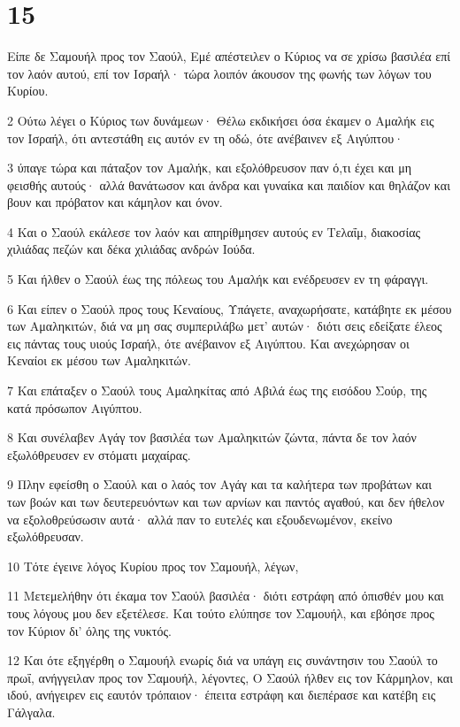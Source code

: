 \chapter{15}

\par Είπε δε Σαμουήλ προς τον Σαούλ, Εμέ απέστειλεν ο Κύριος να σε χρίσω βασιλέα επί τον λαόν αυτού, επί τον Ισραήλ· τώρα λοιπόν άκουσον της φωνής των λόγων του Κυρίου.
\par 2 Ούτω λέγει ο Κύριος των δυνάμεων· Θέλω εκδικήσει όσα έκαμεν ο Αμαλήκ εις τον Ισραήλ, ότι αντεστάθη εις αυτόν εν τη οδώ, ότε ανέβαινεν εξ Αιγύπτου·
\par 3 ύπαγε τώρα και πάταξον τον Αμαλήκ, και εξολόθρευσον παν ό,τι έχει και μη φεισθής αυτούς· αλλά θανάτωσον και άνδρα και γυναίκα και παιδίον και θηλάζον και βουν και πρόβατον και κάμηλον και όνον.
\par 4 Και ο Σαούλ εκάλεσε τον λαόν και απηρίθμησεν αυτούς εν Τελαΐμ, διακοσίας χιλιάδας πεζών και δέκα χιλιάδας ανδρών Ιούδα.
\par 5 Και ήλθεν ο Σαούλ έως της πόλεως του Αμαλήκ και ενέδρευσεν εν τη φάραγγι.
\par 6 Και είπεν ο Σαούλ προς τους Κεναίους, Υπάγετε, αναχωρήσατε, κατάβητε εκ μέσου των Αμαληκιτών, διά να μη σας συμπεριλάβω μετ' αυτών· διότι σεις εδείξατε έλεος εις πάντας τους υιούς Ισραήλ, ότε ανέβαινον εξ Αιγύπτου. Και ανεχώρησαν οι Κεναίοι εκ μέσου των Αμαληκιτών.
\par 7 Και επάταξεν ο Σαούλ τους Αμαληκίτας από Αβιλά έως της εισόδου Σούρ, της κατά πρόσωπον Αιγύπτου.
\par 8 Και συνέλαβεν Αγάγ τον βασιλέα των Αμαληκιτών ζώντα, πάντα δε τον λαόν εξωλόθρευσεν εν στόματι μαχαίρας.
\par 9 Πλην εφείσθη ο Σαούλ και ο λαός τον Αγάγ και τα καλήτερα των προβάτων και των βοών και των δευτερευόντων και των αρνίων και παντός αγαθού, και δεν ήθελον να εξολοθρεύσωσιν αυτά· αλλά παν το ευτελές και εξουδενωμένον, εκείνο εξωλόθρευσαν.
\par 10 Τότε έγεινε λόγος Κυρίου προς τον Σαμουήλ, λέγων,
\par 11 Μετεμελήθην ότι έκαμα τον Σαούλ βασιλέα· διότι εστράφη από όπισθέν μου και τους λόγους μου δεν εξετέλεσε. Και τούτο ελύπησε τον Σαμουήλ, και εβόησε προς τον Κύριον δι' όλης της νυκτός.
\par 12 Και ότε εξηγέρθη ο Σαμουήλ ενωρίς διά να υπάγη εις συνάντησιν του Σαούλ το πρωΐ, ανήγγειλαν προς τον Σαμουήλ, λέγοντες, Ο Σαούλ ήλθεν εις τον Κάρμηλον, και ιδού, ανήγειρεν εις εαυτόν τρόπαιον· έπειτα εστράφη και διεπέρασε και κατέβη εις Γάλγαλα.

